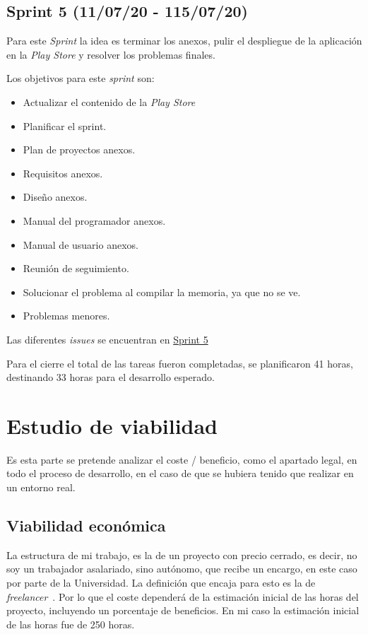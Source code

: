 \subsection{Sprint 5 (11/07/20 - 115/07/20)}\label{sprint-5-11072020---15072020}
Para este \emph{Sprint} la idea es terminar los anexos, pulir el despliegue de la aplicación en la \emph{Play Store} y resolver los problemas finales.

Los objetivos para este \emph{sprint} son:
\begin{itemize}
	\item Actualizar el contenido de la \emph{Play Store}
	\item Planificar el sprint.
	\item Plan de proyectos anexos.
	\item Requisitos anexos.
	\item Diseño anexos.
	\item Manual del programador anexos.
	\item Manual de usuario anexos.
	\item Reunión de seguimiento.
	\item Solucionar el problema al compilar la memoria, ya que no se ve.
	\item Problemas menores.
\end{itemize}

Las diferentes \emph{issues} se encuentran en \href{https://github.com/scc0034/flutter_serpiente/milestone/5?closed=1}{Sprint 5}


Para el cierre el total de las tareas fueron completadas, se planificaron 41 horas, destinando 33 horas para el desarrollo esperado.

\section{Estudio de viabilidad}

Es esta parte se pretende analizar el coste / beneficio, como el apartado legal, en todo el proceso de desarrollo, en el caso de que se hubiera tenido que realizar en un entorno real. 


\subsection{Viabilidad económica}
La estructura de mi trabajo, es la de un proyecto con precio cerrado, es decir, no soy un trabajador asalariado, sino autónomo, que recibe un encargo, en este caso por parte de la Universidad. La definición que encaja para esto es la de \emph{freelancer}~\cite{noauthor_freelancercom_2020}. Por lo que el coste dependerá de la estimación inicial de las horas del proyecto, incluyendo un porcentaje de beneficios. En mi caso la estimación inicial de las horas fue de 250 horas.

